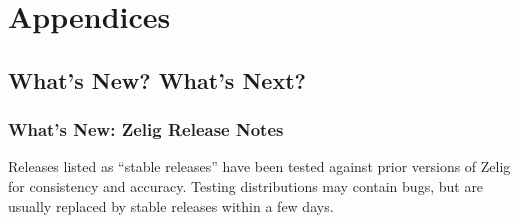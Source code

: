 

\appendix

\part[Appendices]{Appendices}

%



\chapter{What's New?  What's Next?}

\section{What's New:  Zelig Release Notes}\label{release.notes}

Releases listed as ``stable releases'' have been tested against prior
versions of Zelig for consistency and accuracy.  Testing distributions
may contain bugs, but are usually replaced by stable releases within a
few days. 

